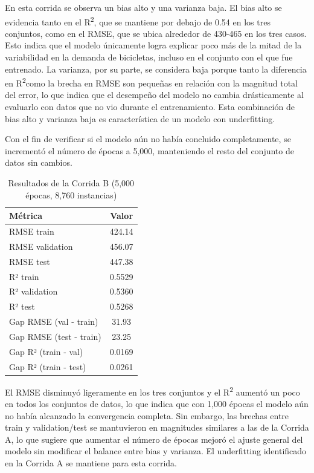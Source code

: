 \documentclass[10pt,journal,compsoc]{IEEEtran}
\begin{document}
En esta corrida se observa un bias alto y una varianza baja. El bias alto se evidencia tanto en el R\textsuperscript{2}, que se mantiene por debajo de 0.54 en los tres conjuntos, como en el RMSE, que se ubica alrededor de 430-465 en los tres casos. Esto indica que el modelo únicamente logra explicar poco más de la mitad de la variabilidad en la demanda de bicicletas, incluso en el conjunto con el que fue entrenado. La varianza, por su parte, se considera baja porque tanto la diferencia en R\textsuperscript{2}como la brecha en RMSE son pequeñas en relación con la magnitud total del error, lo que indica que el desempeño del modelo no cambia drásticamente al evaluarlo con datos que no vio durante el entrenamiento. Esta combinación de bias alto y varianza baja es característica de un modelo con underfitting.

Con el fin de verificar si el modelo aún no había concluido completamente, se incrementó el número de épocas a 5,000, manteniendo el resto del conjunto de datos sin cambios.

\begin{table}[h]
\centering
\caption{Resultados de la Corrida B (5,000 épocas, 8,760 instancias)}
\label{tab:corridaB}
\begin{tabular}{|l|c|}
\hline
\textbf{Métrica} & \textbf{Valor} \\
\hline
RMSE train & 424.14 \\
RMSE validation & 456.07 \\
RMSE test & 447.38 \\
\hline
R² train & 0.5529 \\
R² validation & 0.5360 \\
R² test & 0.5268 \\
\hline
Gap RMSE (val - train) & 31.93 \\
Gap RMSE (test - train) & 23.25 \\
Gap R² (train - val) & 0.0169 \\
Gap R² (train - test) & 0.0261 \\
\hline
\end{tabular}
\end{table}

El RMSE disminuyó ligeramente en los tres conjuntos y el R\textsuperscript{2} aumentó un poco en todos los conjuntos de datos, lo que indica que con 1,000 épocas el modelo aún no había alcanzado la convergencia completa. Sin embargo, las brechas entre train y validation/test se mantuvieron en magnitudes similares a las de la Corrida A, lo que sugiere que aumentar el número de épocas mejoró el ajuste general del modelo sin modificar el balance entre bias y varianza. El underfitting identificado en la Corrida A se mantiene para esta corrida.
\end{document}
